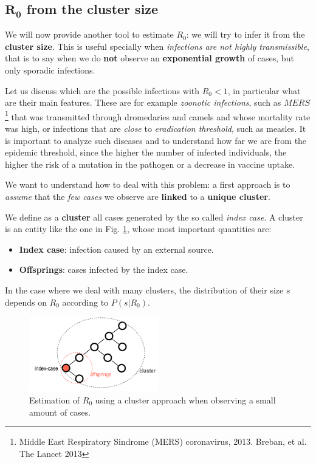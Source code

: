 \documentclass[../main/main.tex]{subfiles}
\begin{document}

\subsection{$\pmb{R_0}$ from the cluster size}

We will now provide another tool to estimate $R_0$: we will try to infer it from the \textbf{cluster size}. This is useful specially when \textit{infections are not highly transmissible}, that is to say when we do \textbf{not} observe an \textbf{exponential growth} of cases, but only sporadic infections.

Let us discuss which are the possible infections with $R_0<1$, in particular what are their main features. These are for example \textit{zoonotic infections}, such as $MERS$\footnote{Middle East Respiratory Sindrome (MERS) coronavirus, 2013. Breban, et al. The Lancet 2013 } that was transmitted through dromedaries and camels and whose mortality rate was high, or infections that are \textit{close} to \textit{eradication threshold}, such as measles. It is important to analyze such diseases and to understand how far we are from the epidemic threshold, since the higher the number of infected individuals, the higher the risk of a mutation in the pathogen or a decrease in vaccine uptake.

We want to understand how to deal with this problem: a first approach is to \textit{assume} that the \textit{few cases} we observe are \textbf{linked} to a \textbf{unique cluster}.

We define as a \textbf{cluster} all cases generated by the so called \textit{index case}. A cluster is an entity like the one in Fig. \ref{fig:22_01}, whose most important quantities are:
\begin{itemize}
    \item \textbf{Index case}: infection caused by an external source.
    \item \textbf{Offsprings}: cases infected by the index case.
\end{itemize}
In the case where we deal with many clusters, the distribution of their size $s$ depends on $R_0$ according to $P(s|R_0)$.

\begin{figure}[h!]
\centering
\includegraphics[width=0.50\textwidth]{../lessons/image/22/image01.png}
\caption{\label{fig:22_01} Estimation of $R_0$ using a cluster approach when observing a small amount of cases.}
\end{figure}
\end{document}
